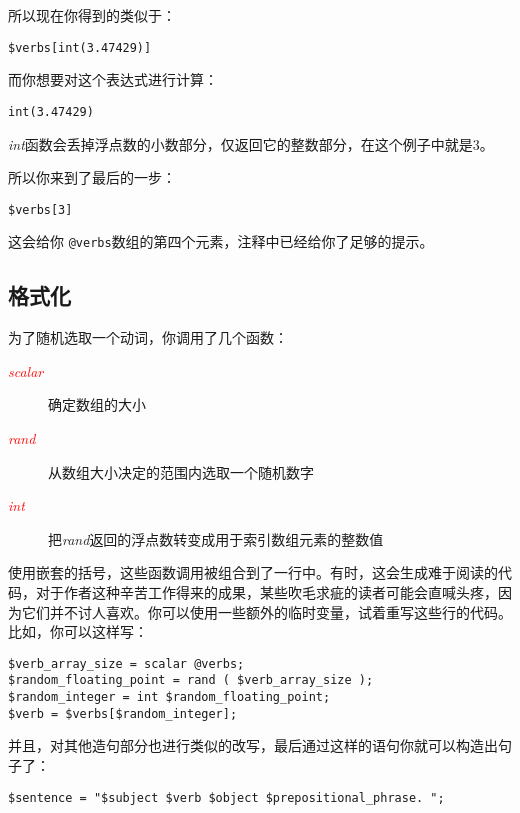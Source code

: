 所以现在你得到的类似于：

\begin{lstlisting}
$verbs[int(3.47429)] 
\end{lstlisting}

而你想要对这个表达式进行计算：

\begin{lstlisting}
int(3.47429) 
\end{lstlisting}

\textit{int}函数会丢掉浮点数的小数部分，仅返回它的整数部分，在这个例子中就是3。

所以你来到了最后的一步：

\begin{lstlisting}
$verbs[3]
\end{lstlisting}

这会给你 \verb|@verbs|数组的第四个元素，注释中已经给你了足够的提示。

\subsection{格式化}
为了随机选取一个动词，你调用了几个函数：

\begin{description}
  \item[\textcolor{red}{\textit{scalar}}] 确定数组的大小
  \item[\textcolor{red}{\textit{rand}}] 从数组大小决定的范围内选取一个随机数字
  \item[\textcolor{red}{\textit{int}}] 把\textit{rand}返回的浮点数转变成用于索引数组元素的整数值
\end{description}

使用嵌套的括号，这些函数调用被组合到了一行中。有时，这会生成难于阅读的代码，对于作者这种辛苦工作得来的成果，某些吹毛求疵的读者可能会直喊头疼，因为它们并不讨人喜欢。你可以使用一些额外的临时变量，试着重写这些行的代码。比如，你可以这样写：

\begin{lstlisting}
$verb_array_size = scalar @verbs;
$random_floating_point = rand ( $verb_array_size );
$random_integer = int $random_floating_point;
$verb = $verbs[$random_integer];
\end{lstlisting}

并且，对其他造句部分也进行类似的改写，最后通过这样的语句你就可以构造出句子了：

\begin{lstlisting}
$sentence = "$subject $verb $object $prepositional_phrase. ";
\end{lstlisting}

